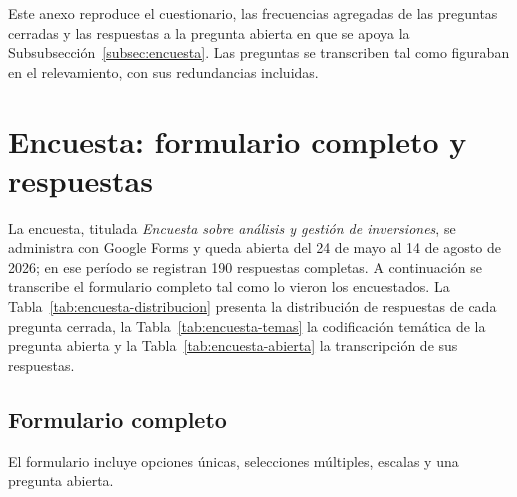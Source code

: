 \label{annex:user-research}

Este anexo reproduce el cuestionario, las frecuencias agregadas de las preguntas cerradas y las respuestas a la pregunta abierta en que se apoya la Subsubsección~\ref{subsec:encuesta}. Las preguntas se transcriben tal como figuraban en el relevamiento, con sus redundancias incluidas.

\section*{Encuesta: formulario completo y respuestas}

La encuesta, titulada \textit{Encuesta sobre análisis y gestión de inversiones}, se administra con Google Forms y queda abierta del 24 de mayo al 14 de agosto de 2026; en ese período se registran 190 respuestas completas. A continuación se transcribe el formulario completo tal como lo vieron los encuestados. La Tabla~\ref{tab:encuesta-distribucion} presenta la distribución de respuestas de cada pregunta cerrada, la Tabla~\ref{tab:encuesta-temas} la codificación temática de la pregunta abierta y la Tabla~\ref{tab:encuesta-abierta} la transcripción de sus respuestas.

\subsection*{Formulario completo}

El formulario incluye opciones únicas, selecciones múltiples, escalas y una pregunta abierta.

